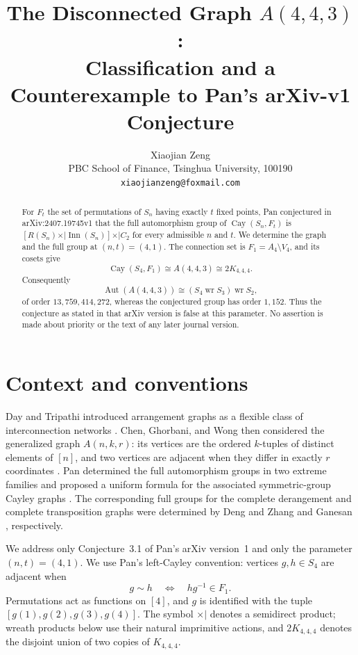 \documentclass[11pt]{article}
\title{The Disconnected Graph $A(4,4,3)$:\\
Classification and a Counterexample to Pan's arXiv-v1 Conjecture}
\author{Xiaojian Zeng\\
PBC School of Finance, Tsinghua University, 100190\\
\texttt{xiaojianzeng@foxmail.com}}
\date{}
\newcommand{\sdp}{\mathbin{\times\!\!|}}
\newcommand{\wprod}{\mathbin{\operatorname{wr}}}
\DeclareMathOperator{\Aut}{Aut}
\newcommand{\Cay}{\operatorname{Cay}}
\begin{document}
\maketitle

\begin{abstract}
For $F_t$ the set of permutations of $S_n$ having exactly $t$ fixed
points, Pan conjectured in arXiv:2407.19745v1 that the full automorphism
group of $\Cay(S_n,F_t)$ is
$[R(S_n)\sdp\operatorname{Inn}(S_n)]\sdp C_2$ for every admissible
$n$ and $t$.  We determine the graph and the full group at
$(n,t)=(4,1)$.  The connection set is $F_1=A_4\setminus V_4$, and its
cosets give
\[
  \Cay(S_4,F_1)\cong A(4,4,3)\cong 2K_{4,4,4}.
\]
Consequently
\[
  \Aut(A(4,4,3))\cong (S_4\wprod S_3)\wprod S_2,
\]
of order $13{,}759{,}414{,}272$, whereas the conjectured group has order
$1{,}152$.  Thus the conjecture as stated in that arXiv version is false
at this parameter.  No assertion is made about priority or the text of
any later journal version.
\end{abstract}

\section{Context and conventions}

Day and Tripathi introduced arrangement graphs as a flexible class of
interconnection networks \cite{DayTripathi1992}.  Chen, Ghorbani, and Wong
then considered the generalized graph $A(n,k,r)$: its vertices are the
ordered $k$-tuples of distinct elements of $[n]$, and two vertices are
adjacent when they differ in exactly $r$ coordinates
\cite{ChenGhorbaniWong2014}.  Pan determined the full automorphism groups
in two extreme families and proposed a uniform formula for the associated
symmetric-group Cayley graphs \cite{Pan2024}.  The corresponding full
groups for the complete derangement and complete transposition graphs
were determined by Deng and Zhang \cite{DengZhang2011} and Ganesan
\cite{Ganesan2015}, respectively.

We address only Conjecture~3.1 of Pan's arXiv version~1 and only the
parameter $(n,t)=(4,1)$.  We use Pan's left-Cayley convention: vertices
$g,h\in S_4$ are adjacent when
\[
 g\sim h \quad\Longleftrightarrow\quad hg^{-1}\in F_1.
 \tag{1}\label{eq:cayley}
\]
Permutations act as functions on $[4]$, and $g$ is identified with the
tuple $[g(1),g(2),g(3),g(4)]$.  The symbol $\sdp$ denotes a semidirect
product; wreath products below use their natural
imprimitive actions, and $2K_{4,4,4}$ denotes the disjoint union of two
copies of $K_{4,4,4}$.
\end{document}
